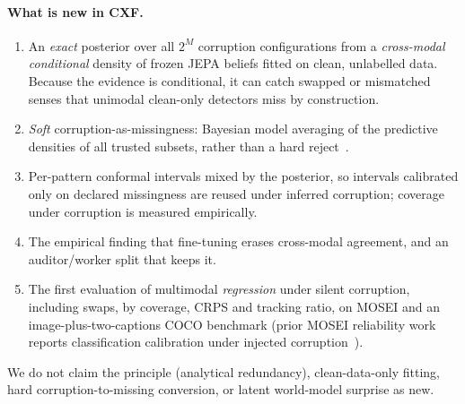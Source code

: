 \documentclass[10pt,twocolumn]{article}
\begin{document}
\paragraph{What is new in CXF.}
\begin{enumerate}
\item An \emph{exact} posterior over all $2^M$ corruption configurations from a \emph{cross-modal conditional} density
  of frozen JEPA beliefs fitted on clean, unlabelled data. Because the evidence is conditional, it can catch swapped or
  mismatched senses that unimodal clean-only detectors miss by construction.
\item \emph{Soft} corruption-as-missingness: Bayesian model averaging of the predictive densities of all trusted
  subsets, rather than a hard reject~\cite{lee2020detect,mohapatra2026carat}.
\item Per-pattern conformal intervals mixed by the posterior, so intervals calibrated only on declared missingness are
  reused under inferred corruption; coverage under corruption is measured empirically.
\item The empirical finding that fine-tuning erases cross-modal agreement, and an auditor/worker split that keeps it.
\item The first evaluation of multimodal \emph{regression} under silent corruption, including swaps, by coverage, CRPS
  and tracking ratio, on MOSEI and an image-plus-two-captions COCO benchmark (prior MOSEI reliability work reports
  classification calibration under injected corruption~\cite{wu2026electronics}).
\end{enumerate}
We do not claim the principle (analytical redundancy), clean-data-only fitting, hard corruption-to-missing conversion,
or latent world-model surprise as new.
\end{document}
